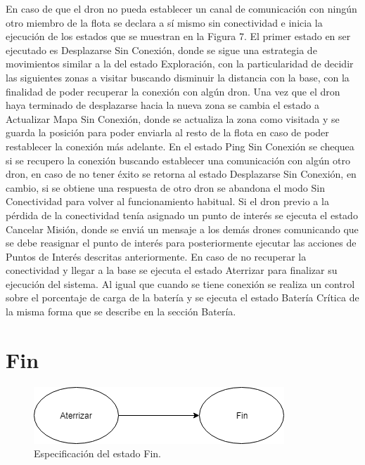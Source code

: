 En caso de que el dron no pueda establecer un canal de comunicación con ningún otro miembro de la flota se declara a sí mismo sin conectividad e inicia la ejecución de los estados que se muestran en la Figura 7.
El primer estado en ser ejecutado es Desplazarse Sin Conexión, donde se sigue una estrategia de movimientos similar a la del estado Exploración, con la particularidad de decidir las siguientes zonas a visitar buscando disminuir la distancia con la base, con la finalidad de poder recuperar la conexión con algún dron.
Una vez que el dron haya terminado de desplazarse hacia la nueva zona se cambia el estado a Actualizar Mapa Sin Conexión, donde se actualiza la zona como visitada y se guarda la posición para poder enviarla al resto de la flota en caso de poder restablecer la conexión más adelante.
En el estado Ping Sin Conexión se chequea si se recupero la conexión buscando establecer una comunicación con algún otro dron, en caso de no tener éxito se retorna al estado Desplazarse Sin Conexión, en cambio, si se obtiene una respuesta de otro dron se abandona el modo Sin Conectividad  para volver al funcionamiento habitual.
Si el dron previo a la pérdida de la conectividad tenía asignado un punto de interés se ejecuta el estado Cancelar Misión, donde se enviá un mensaje a los demás drones comunicando que se debe reasignar el punto de interés para posteriormente ejecutar las acciones de Puntos de Interés descritas anteriormente.
En caso de no recuperar la conectividad y llegar a la base se ejecuta el estado Aterrizar para finalizar su ejecución del sistema.
Al igual que cuando se tiene conexión se realiza un control sobre el porcentaje de carga de la batería y se ejecuta el estado Batería Crítica de la misma forma que se describe en la sección Batería.
\section {Fin}


\begin{figure}[h!]
	\label{fig:comp}
	\includegraphics[width=.8\textwidth]{imagenes/chap5/image8}
	\caption{Especificación del estado Fin.}
\end{figure}


